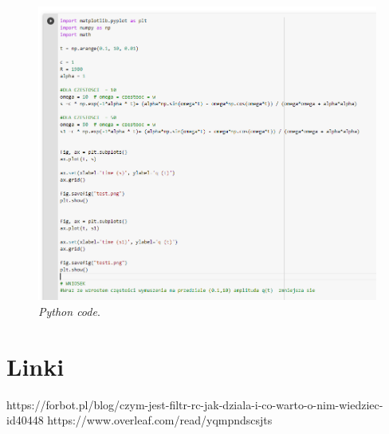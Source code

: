 \documentclass[12pt,oneside,a4paper]{book} %
\begin{document}
\begin{figure}[h]
\begin{center} 
\includegraphics[scale=0.6]{./images/002.PNG} 
\caption{\textit{Python code}.\newline }
\label{rys:logoup}
\end{center}
\end{figure}


\chapter{Linki }

https://forbot.pl/blog/czym-jest-filtr-rc-jak-dziala-i-co-warto-o-nim-wiedziec-id40448 
https://www.overleaf.com/read/yqmpndscsjts 
\end{document}
